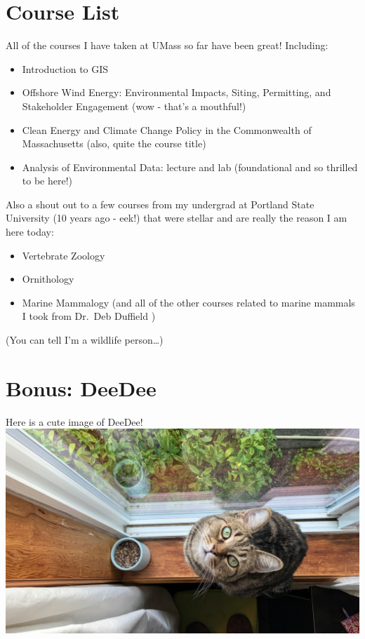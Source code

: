 \documentclass[
]{article}
\providecommand{\tightlist}{%
  \setlength{\itemsep}{0pt}\setlength{\parskip}{0pt}}
\begin{document}
\hypertarget{course-list}{%
\section{Course List}\label{course-list}}

All of the courses I have taken at UMass so far have been great!
Including:

\begin{itemize}
\tightlist
\item
  Introduction to GIS
\item
  Offshore Wind Energy: Environmental Impacts, Siting, Permitting, and
  Stakeholder Engagement (wow - that's a mouthful!)\\
\item
  Clean Energy and Climate Change Policy in the Commonwealth of
  Massachusetts (also, quite the course title)
\item
  Analysis of Environmental Data: lecture and lab (foundational and so
  thrilled to be here!)
\end{itemize}

Also a shout out to a few courses from my undergrad at Portland State
University (10 years ago - eek!) that were stellar and are really the
reason I am here today:

\begin{itemize}
\tightlist
\item
  Vertebrate Zoology
\item
  Ornithology
\item
  Marine Mammalogy (and all of the other courses related to marine
  mammals I took from Dr.~Deb Duffield )
\end{itemize}

(You can tell I'm a wildlife person\ldots)

\hypertarget{bonus-deedee}{%
\section{Bonus: DeeDee}\label{bonus-deedee}}

Here is a cute image of DeeDee! \includegraphics{assignments/dee.jpg}
\end{document}
